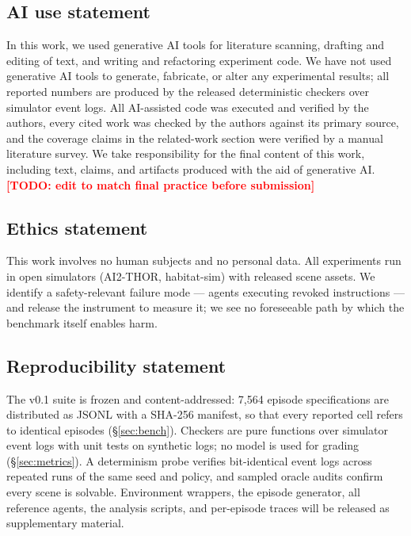 \documentclass{article} %
\newcommand{\todo}[1]{\textbf{\textcolor{red}{[TODO: #1]}}}
\begin{document}
\subsection*{AI use statement}
In this work, we used generative AI tools for literature scanning, drafting
and editing of text, and writing and refactoring experiment code. We have not
used generative AI tools to generate, fabricate, or alter any experimental
results; all reported numbers are produced by the released deterministic
checkers over simulator event logs. All AI-assisted code was executed and
verified by the authors, every cited work was checked by the authors against
its primary source, and the coverage claims in the related-work section were
verified by a manual literature survey. We take responsibility for the final
content of this work, including text, claims, and artifacts produced with the
aid of generative AI. \todo{edit to match final practice before submission}

\subsection*{Ethics statement}
This work involves no human subjects and no personal data. All experiments run
in open simulators (AI2-THOR, habitat-sim) with released scene assets. We
identify a safety-relevant failure mode --- agents executing revoked
instructions --- and release the instrument to measure it; we see no
foreseeable path by which the benchmark itself enables harm.

\subsection*{Reproducibility statement}
The v0.1 suite is frozen and content-addressed: 7{,}564 episode specifications
are distributed as JSONL with a SHA-256 manifest, so that every reported cell
refers to identical episodes (\S\ref{sec:bench}). Checkers are pure functions
over simulator event logs with unit tests on synthetic logs; no model is used
for grading (\S\ref{sec:metrics}). A determinism probe verifies bit-identical
event logs across repeated runs of the same seed and policy, and sampled oracle
audits confirm every scene is solvable. Environment wrappers, the episode
generator, all reference agents, the analysis scripts, and per-episode traces
will be released as supplementary material.
\end{document}
